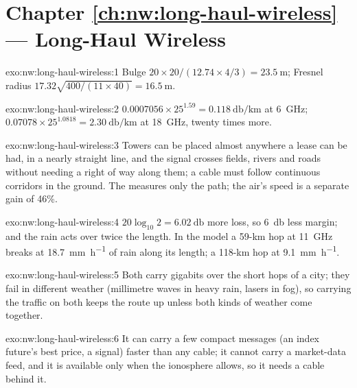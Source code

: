 \section*{Chapter \ref{ch:nw:long-haul-wireless} --- Long-Haul Wireless}

\begin{solution}{exo:nw:long-haul-wireless:1}
Bulge $20 \times 20 / (12.74 \times 4/3) = \qty{23.5}{\metre}$; Fresnel radius $17.32\sqrt{400/(11 \times 40)} = \qty{16.5}{\metre}$.
\end{solution}

\begin{solution}{exo:nw:long-haul-wireless:2}
$0.0007056 \times 25^{1.59} = \qty{0.118}{\decibel\per\kilo\metre}$ at \qty{6}{\giga\hertz}; $0.07078 \times 25^{1.0818} = \qty{2.30}{\decibel\per\kilo\metre}$ at
\qty{18}{\giga\hertz}, twenty times more.
\end{solution}

\begin{solution}{exo:nw:long-haul-wireless:3}
Towers can be placed almost anywhere a lease can be had, in a nearly straight line, and the signal crosses fields, rivers and roads without
needing a right of way along them; a cable must follow continuous corridors in the ground. The  measures only the path; the air's
speed is a separate gain of 46\%.
\end{solution}

\begin{solution}{exo:nw:long-haul-wireless:4}
$20\log_{10} 2 = \qty{6.02}{\decibel}$ more loss, so \qty{6}{\decibel} less margin; and the rain acts over twice the length. In the model a 59-km
hop at \qty{11}{\giga\hertz} breaks at \qty{18.7}{\milli\metre\per\hour} of rain along its length; a 118-km hop at \qty{9.1}{\milli\metre\per\hour}.
\end{solution}

\begin{solution}{exo:nw:long-haul-wireless:5}
Both carry gigabits over the short hops of a city; they fail in different weather (millimetre waves in heavy rain, lasers in fog), so carrying
the traffic on both keeps the route up unless both kinds of weather come together.
\end{solution}

\begin{solution}{exo:nw:long-haul-wireless:6}
It can carry a few compact messages (an index future's best price, a signal) faster than any cable; it cannot carry a market-data feed, and it
is available only when the ionosphere allows, so it needs a cable behind it.
\end{solution}

